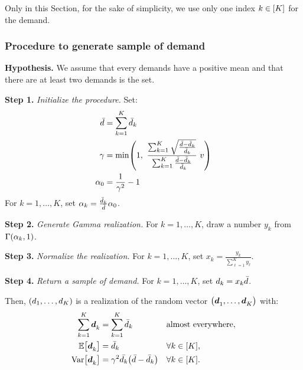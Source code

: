 Only in this Section, for the sake of simplicity, we use only one index $k\in\range{K}$ for the demand.



\subsubsection{Procedure to generate sample of demand}


\textbf{Hypothesis.} We assume that every demands have a positive mean and that there are at least two demands is the set.

\textbf{Step 1.} \emph{Initialize the procedure.}
Set:
\begin{subequations}
  \begin{align*}
    \bar{\demand} &= \sum_{k=1}^K\bar{\demand}_k
    \\
    \gamma &= \min \bracket{1,\
    \frac
    {\sum_{k=1}^K\sqrt{\frac{\bar{\demand}-\bar{\demand}_k}{\bar{\demand}_k}}}{\sum_{k=1}^K\frac{\bar{\demand}-\bar{\demand}_k}{\bar{\demand}_k}}\ v}
    \\
    \alpha_0 &= \frac{1}{\gamma^2}-1
  \end{align*}
\end{subequations}
For $k=1,\ldots,K$, set $\alpha_k=\frac{\bar{d}_k}{\bar{d}}\alpha_0$.

\textbf{Step 2.} \emph{Generate Gamma realization.}
For $k=1,\ldots,K$, draw a number $y_k$ from $\Gamma\bracket{\alpha_k,1}$.

\textbf{Step 3.} \emph{Normalize the realization.}
For $k=1,\ldots,K$, set $x_k=\frac{y_k}{\sum_{\ell=1}^K y_{\ell}}$.

\textbf{Step 4.} \emph{Return a sample of demand.}
For $k=1,\ldots,K$, set $d_k = x_k \bar{d}$.

Then, $\bracket{\demand_1,\ldots,\demand_K}$ is a realization of the random vector $\bracket{\va\demand_1,\ldots,\va\demand_K}$ with:
\begin{subequations}
  \begin{align}
    \sum_{k=1}^K \va\demand_k &= \sum_{k=1}^K \bar{\demand}_k && \mbox{almost everywhere},
    \\
    \espe\sqbracket{\va\demand_k} &= \bar{\demand}_k && \forall k\in\range{K},
    \\
    \vari\sqbracket{\va\demand_k} &= \gamma^2\bar{\demand_k}\bracket{\bar{\demand}-\bar{\demand}_k} && \forall k\in\range{K}.
    \label{eq:dirichlet:procedure:variance}
  \end{align}
\end{subequations}



